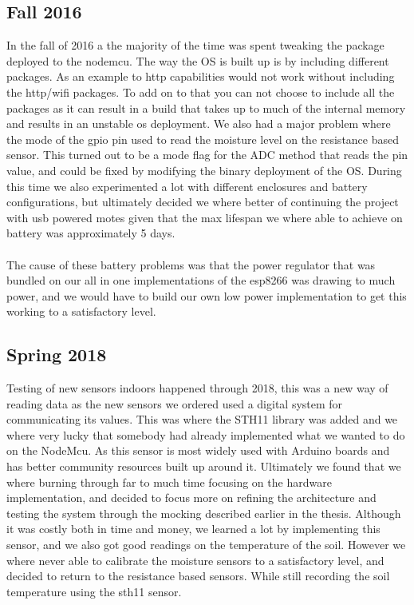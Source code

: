 \documentclass[]{uiophd}
\begin{document}
\subsection{Fall 2016}
In the fall of 2016 a the majority of the time was spent tweaking the package deployed to the nodemcu. The way the OS is built up is by including different packages. As an example to http capabilities would not work without including the http/wifi packages. To add on to that you can not choose to include all the packages as it can result in a build that takes up to much of the internal memory and results in an unstable os deployment. We also had a major problem where the mode of the gpio pin used to read the moisture level on the resistance based sensor. This turned out to be a mode flag for the ADC method that reads the pin value, and could be fixed by modifying the binary deployment of the OS. During this time we also experimented a lot with different enclosures and battery configurations, but ultimately decided we where better of continuing the project with usb powered motes given that the max lifespan we where able to achieve on battery was approximately 5 days.
\\\\
The cause of these battery problems was that the power regulator that was bundled on our all in one implementations of the esp8266 was drawing to much power, and we would have to build our own low power implementation to get this working to a satisfactory level.
\subsection{Spring 2018}
Testing of new sensors indoors happened through 2018, this was a new way of reading data as the new sensors we ordered used a digital system for communicating its values. This was where the STH11 library was added and we where very lucky that somebody had already implemented what we wanted to do on the NodeMcu. As this sensor is most widely used with Arduino boards and has better community resources built up around it. Ultimately we found that we where burning through far to much time focusing on the hardware implementation, and decided to focus more on refining the architecture and testing the system through the mocking described earlier in the thesis. Although it was costly both in time and money, we learned a lot by implementing this sensor, and we also got good readings on the temperature of the soil. However we where never able to calibrate the moisture sensors to a satisfactory level, and decided to return to the resistance based sensors. While still recording the soil temperature using the sth11 sensor. 
\end{document}
